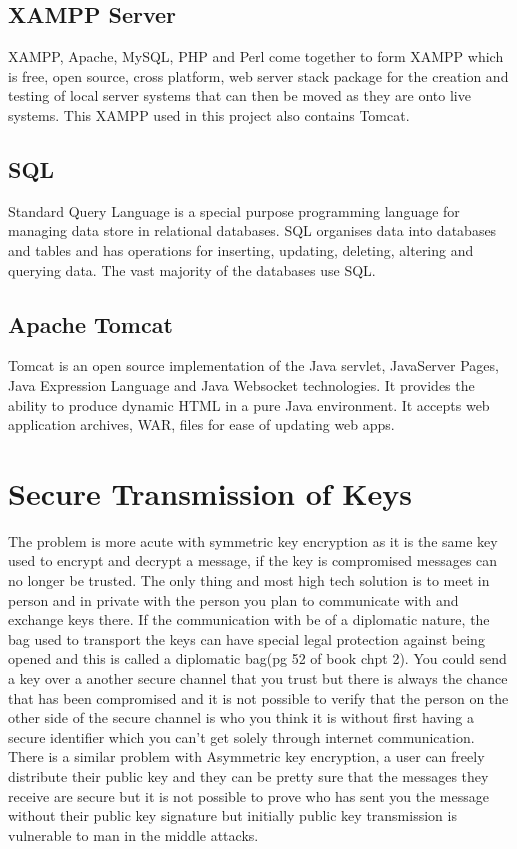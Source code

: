 \subsection{XAMPP Server}

XAMPP, Apache, MySQL, PHP and Perl come together to form XAMPP which is free, open source, cross platform, web server stack package for the creation and testing of local server systems that can then be moved as they are onto live systems. This XAMPP used in this project also contains Tomcat.

\subsection{SQL}

Standard Query Language is a special purpose programming language for managing data store in relational databases. SQL organises data into databases and tables and has operations for inserting, updating, deleting, altering and querying data. The vast majority of the databases use SQL.

\subsection{Apache Tomcat}

Tomcat is an open source implementation of the Java servlet, JavaServer Pages, Java Expression Language and Java Websocket technologies. It provides the ability to produce dynamic HTML in a pure Java environment. It accepts web application archives, WAR, files for ease of updating web apps.

\section{Secure Transmission of Keys}

The problem is more acute with symmetric key encryption as it is the same key used to encrypt and decrypt a message, if the key is compromised messages can no longer be trusted. The only thing and most high tech solution is to meet in person and in private with the person you plan to communicate with and exchange keys there. If the communication with be of a diplomatic nature, the bag used to transport the keys can have special legal protection against being opened and this is called a diplomatic bag(pg 52 of book chpt 2). You could send a key over a another secure channel that you trust but there is always the chance that has been compromised and it is not possible to verify that the person on the other side of the secure channel is who you think it is without first having a secure identifier which you can't get solely through internet communication. There is a similar problem with Asymmetric key encryption, a user can freely distribute their public key and they can be pretty sure that the messages they receive are secure but it is not possible to prove who has sent you the message without their public key signature but initially public key transmission is vulnerable to man in the middle attacks.
